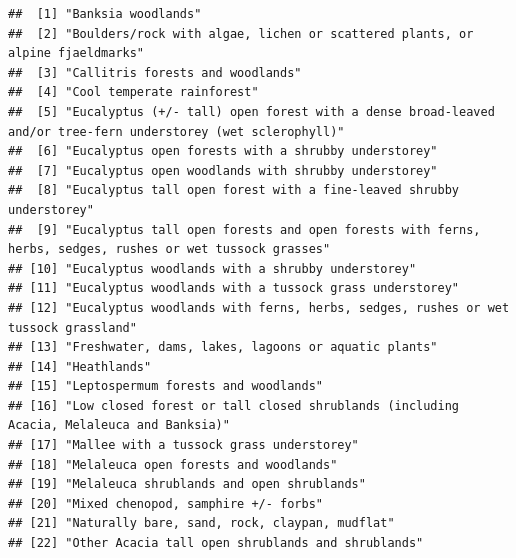 \documentclass[
  12pt,
]{book}
\begin{document}
\begin{verbatim}
##  [1] "Banksia woodlands"                                                                                         
##  [2] "Boulders/rock with algae, lichen or scattered plants, or alpine fjaeldmarks"                               
##  [3] "Callitris forests and woodlands"                                                                           
##  [4] "Cool temperate rainforest"                                                                                 
##  [5] "Eucalyptus (+/- tall) open forest with a dense broad-leaved and/or tree-fern understorey (wet sclerophyll)"
##  [6] "Eucalyptus open forests with a shrubby understorey"                                                        
##  [7] "Eucalyptus open woodlands with shrubby understorey"                                                        
##  [8] "Eucalyptus tall open forest with a fine-leaved shrubby understorey"                                        
##  [9] "Eucalyptus tall open forests and open forests with ferns, herbs, sedges, rushes or wet tussock grasses"    
## [10] "Eucalyptus woodlands with a shrubby understorey"                                                           
## [11] "Eucalyptus woodlands with a tussock grass understorey"                                                     
## [12] "Eucalyptus woodlands with ferns, herbs, sedges, rushes or wet tussock grassland"                           
## [13] "Freshwater, dams, lakes, lagoons or aquatic plants"                                                        
## [14] "Heathlands"                                                                                                
## [15] "Leptospermum forests and woodlands"                                                                        
## [16] "Low closed forest or tall closed shrublands (including Acacia, Melaleuca and Banksia)"                     
## [17] "Mallee with a tussock grass understorey"                                                                   
## [18] "Melaleuca open forests and woodlands"                                                                      
## [19] "Melaleuca shrublands and open shrublands"                                                                  
## [20] "Mixed chenopod, samphire +/- forbs"                                                                        
## [21] "Naturally bare, sand, rock, claypan, mudflat"                                                              
## [22] "Other Acacia tall open shrublands and shrublands"                                                          

\end{verbatim}
\end{document}
